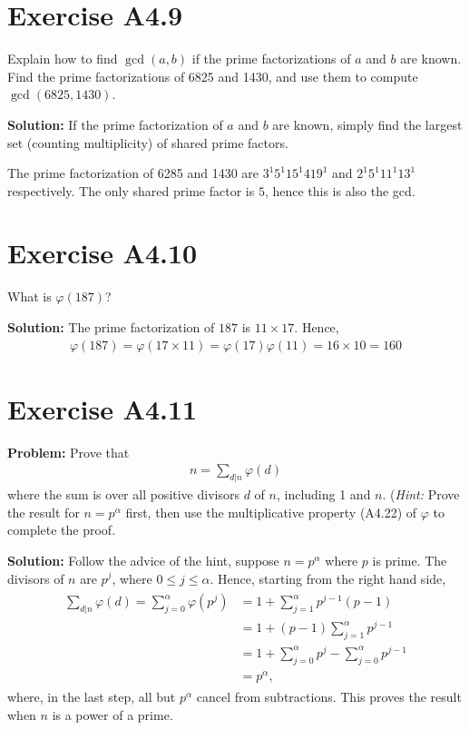 \documentclass{book}
\begin{document}
\section*{Exercise A4.9}
    Explain how to find $\gcd(a,b)$ if the prime factorizations of $a$ and $b$ are known. Find the prime factorizations of 6825 and 1430, and use them to compute $\gcd(6825,1430)$.
    
    \textbf{Solution:} If the prime factorization of $a$ and $b$ are known, simply find the largest set (counting multiplicity) of shared prime factors. 

    The prime factorization of 6285 and 1430 are $3^1 5^1 15^1 419^1$ and $2^1 5^1 11^1 13^1$ respectively. The only shared prime factor is $5$, hence this is also the gcd.

\section*{Exercise A4.10}
    What is $\varphi(187)$?
    
    \textbf{Solution:} The prime factorization of $187$ is $11\times17$. Hence,
    \begin{align}
        \varphi(187) = \varphi(17\times 11) = \varphi(17)\varphi(11) = 16 \times 10 = 160
    \end{align}

\section*{Exercise A4.11}
    \textbf{Problem:} Prove that
    \begin{align}
        n = \sum_{d|n} \varphi(d)
    \end{align}
    where the sum is over all positive divisors $d$ of $n$, including 1 and $n$. (\emph{Hint:} Prove the result for $n=p^\alpha$ first, then use the multiplicative property (A4.22) of $\varphi$ to complete the proof.

    \textbf{Solution:} Follow the advice of the hint, suppose $n=p^\alpha$ where $p$ is prime. The divisors of $n$ are $p^j$, where $0\leq j \leq \alpha$. Hence, starting from the right hand side,
    \begin{align}
    \begin{aligned}
        \sum_{d|n} \varphi(d) = \sum_{j=0}^\alpha \varphi(p^j) &=1 +  \sum_{j=1}^\alpha p^{j-1}(p-1)\\
        &= 1+ (p-1)\sum_{j=1}^\alpha p^{j-1} \\
        &= 1 + \sum_{j=0}^\alpha p^j -\sum_{j=0}^\alpha p^{j-1} \\
        &= p^\alpha,
    \end{aligned}
    \end{align}
    where, in the last step, all but $p^\alpha$ cancel from subtractions. This proves the result when $n$ is a power of a prime.
    
\end{document}
